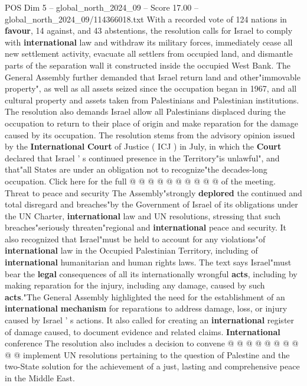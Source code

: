 \begin{textsample}{POS Dim 5 – global\_north\_2024\_09 – Score 17.00 – global\_north\_2024\_09/114366018.txt}  \label{ex:f5_pos_353}
With a recorded vote of 124 nations in \textbf{favour}, 14 against, and 43 abstentions, the resolution calls for Israel to comply with \textbf{international} law and withdraw its military forces, immediately cease all new settlement activity, evacuate all settlers from occupied land, and dismantle parts of the separation wall it constructed inside the occupied West Bank.
The General Assembly further demanded that Israel return land and other"immovable property", as well as all assets seized since the occupation began in 1967, and all cultural property and assets taken from Palestinians and Palestinian institutions.
The resolution also demands Israel allow all Palestinians displaced during the occupation to return to their place of origin and make reparation for the damage caused by its occupation.
The resolution stems from the advisory opinion issued by the \textbf{International} \textbf{Court} of Justice ( ICJ ) in July, in which the \textbf{Court} declared that Israel ' s continued presence in the Territory"is unlawful", and that"all States are under an obligation not to recognize"the decades-long occupation.
Click here for the full @ @ @ @ @ @ @ @ @ @ of the meeting.
Threat to peace and security The Assembly"strongly \textbf{deplored} the continued and total disregard and breaches"by the Government of Israel of its obligations under the UN Charter, \textbf{international} law and UN resolutions, stressing that such breaches"seriously threaten"regional and \textbf{international} peace and security.
It also recognized that Israel"must be held to account for any violations"of \textbf{international} law in the Occupied Palestinian Territory, including of \textbf{international} humanitarian and human rights laws.
The text says Israel"must bear the \textbf{legal} consequences of all its internationally wrongful \textbf{acts}, including by making reparation for the injury, including any damage, caused by such \textbf{acts}."The General Assembly highlighted the need for the establishment of an \textbf{international} \textbf{mechanism} for reparations to address damage, loss, or injury caused by Israel ' s actions.
It also called for creating an \textbf{international} register of damage caused, to document evidence and related claims. \textbf{International} conference The resolution also includes a decision to convene @ @ @ @ @ @ @ @ @ @ implement UN resolutions pertaining to the question of Palestine and the two-State solution for the achievement of a just, lasting and comprehensive peace in the Middle East.

\end{textsample}
